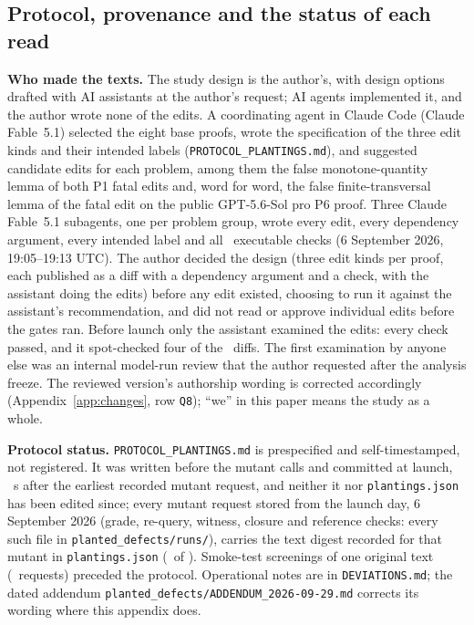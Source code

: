 \subsection{Protocol, provenance and the status of each read}
\label{app:planted-protocol}
\textbf{Who made the texts.} The study design is the author's, with design options drafted with AI assistants at the author's request; AI agents implemented it, and the author wrote none of the edits. A coordinating agent in Claude Code (Claude Fable~5.1) selected the eight base proofs, wrote the specification of the three edit kinds and their intended labels (\texttt{PROTOCOL\_PLANTINGS.md}), and suggested candidate edits for each problem, among them the false monotone-quantity lemma of both P1 fatal edits and, word for word, the false finite-transversal lemma of the fatal edit on the public GPT-5.6-Sol pro P6 proof. Three Claude Fable~5.1 subagents, one per problem group, wrote every edit, every dependency argument, every intended label and all \CRNChecks\ executable checks (6 September 2026, 19:05--19:13 UTC). The author decided the design (three edit kinds per proof, each published as a diff with a dependency argument and a check, with the assistant doing the edits) before any edit existed, choosing to run it against the assistant's recommendation, and did not read or approve individual edits before the gates ran. Before launch only the assistant examined the edits: every check passed, and it spot-checked four of the \CRNMutants\ diffs. The first examination by anyone else was an internal model-run review that the author requested after the analysis freeze. The reviewed version's authorship wording is corrected accordingly (Appendix~\ref{app:changes}, row \texttt{Q8}); ``we'' in this paper means the study as a whole.

\textbf{Protocol status.} \texttt{PROTOCOL\_PLANTINGS.md} is prespecified and self-timestamped, not registered. It was written before the mutant calls and committed at launch, \CRCommitLagSec~s after the earliest recorded mutant request, and neither it nor \texttt{plantings.json} has been edited since; every mutant request stored from the launch day, 6 September 2026 (grade, re-query, witness, closure and reference checks: every such file in \texttt{planted\_defects/\allowbreak runs/}), carries the text digest recorded for that mutant in \texttt{plantings.json} (\CRHashMatch\ of \CRMutantRequests). Smoke-test screenings of one original text (\CRSmokeScreens\ requests) preceded the protocol. Operational notes are in \texttt{DEVIATIONS.md}; the dated addendum \texttt{planted\_defects/\allowbreak ADDENDUM\_2026-09-29.md} corrects its wording where this appendix does.

